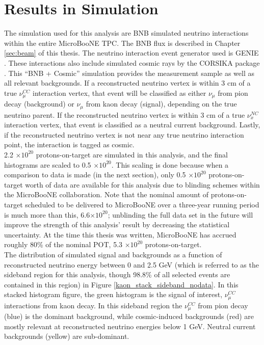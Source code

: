 \section{Results in Simulation}
The simulation used for this analysis are BNB simulated neutrino interactions within the entire MicroBooNE TPC. The BNB flux is described in Chapter \ref{sec:beam} of this thesis. The neutrino interaction event generator used is GENIE \cite{GENIEsource}. These interactions also include simulated cosmic rays by the CORSIKA package \cite{CORSIKAsource}. This ``BNB + Cosmic'' simulation provides the measurement sample as well as all relevant backgrounds. If a reconstructed neutrino vertex is within 3 cm of a true $\nu_\mu^{CC}$ interaction vertex, that event will be classified as either $\nu_\mu$ from pion decay (background) or $\nu_\mu$ from kaon decay (signal), depending on the true neutrino parent. If the reconstructed neutrino vertex is within 3 cm of a true $\nu_x^{NC}$ interaction vertex, that event is classified as a neutral current background. Lastly, if the reconstructed neutrino vertex is not near any true neutrino interaction point, the interaction is tagged as cosmic.\\

2.2 $\times 10^{20}$ protons-on-target are simulated in this analysis, and the final histograms are scaled to 0.5 $\times 10^{20}$. This scaling is done because when a comparison to data is made (in the next section), only 0.5 $\times 10^{20}$ protons-on-target worth of data are available for this analysis due to blinding schemes within the MicroBooNE collaboration. Note that the nominal amount of protons-on-target scheduled to be delivered to MicroBooNE over a three-year running period is much more than this, 6.6$\times 10^{20}$; unblinding the full data set in the future will improve the strength of this analysis' result by decreasing the statistical uncertainty. At the time this thesis was written, MicroBooNE has accrued roughly 80\% of the nominal POT, 5.3 $\times 10^{20}$ protons-on-target.\\

The distribution of simulated signal and backgrounds as a function of reconstructed neutrino energy between 0 and 2.5 GeV (which is referred to as the sideband region for this analysis, though 98.8\% of all selected events are contained in this region) in Figure \ref{kaon_stack_sideband_nodata}. In this stacked histogram figure, the green histogram is the signal of interest, $\nu_\mu^{CC}$ interactions from kaon decay. In this sideband region the $\nu_\mu^{CC}$ from pion decay (blue) is the dominant background, while cosmic-induced backgrounds (red) are mostly relevant at reconstructed neutrino energies below 1 GeV. Neutral current backgrounds (yellow) are sub-dominant.\\

